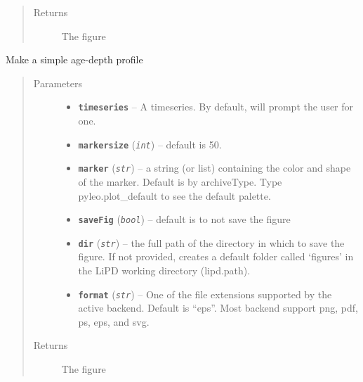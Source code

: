 \documentclass[letterpaper,10pt,english]{sphinxmanual}
\begin{document}
\begin{fulllineitems}
\begin{fulllineitems}
\begin{quote}
\begin{description}
\item[{Returns}] \leavevmode
The figure

\end{description}\end{quote}

\end{fulllineitems}


\begin{fulllineitems}
\label{TSPlots:pyleoclim.Plot.plot_agemodel}
Make a simple age-depth profile
\begin{quote}\begin{description}
\item[{Parameters}] \leavevmode\begin{itemize}
\item {} 
\textbf{\texttt{timeseries}} -- A timeseries. By default, will prompt the user for one.

\item {} 
\textbf{\texttt{markersize}} (\emph{\texttt{int}}) -- default is 50.

\item {} 
\textbf{\texttt{marker}} (\emph{\texttt{str}}) -- a string (or list) containing the color and shape of
the marker. Default is by archiveType. Type pyleo.plot\_default
to see the default palette.

\item {} 
\textbf{\texttt{saveFig}} (\emph{\texttt{bool}}) -- default is to not save the figure

\item {} 
\textbf{\texttt{dir}} (\emph{\texttt{str}}) -- the full path of the directory in which to save the figure.
If not provided, creates a default folder called `figures' in
the LiPD working directory (lipd.path).

\item {} 
\textbf{\texttt{format}} (\emph{\texttt{str}}) -- One of the file extensions supported by the active
backend. Default is ``eps''. Most backend support png, pdf, ps,
eps, and svg.

\end{itemize}

\item[{Returns}] \leavevmode
The figure


\end{description}
\end{quote}
\end{fulllineitems}
\end{fulllineitems}
\end{document}
